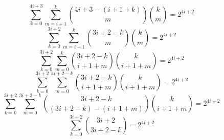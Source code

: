 \begin{equation*}
    \sum_{k=0}^{4i+3} \sum_{m=i+1}^{k} \binom{4i+3-(i+1+k)}{m} \binom{k}{m} = 2^{4i+2}
\end{equation*}
\begin{equation*}
    \sum_{k=0}^{3i+2} \sum_{m=i+1}^{k} \binom{3i+2-k}{m} \binom{k}{m} = 2^{4i+2}
\end{equation*}
\begin{equation*}
    \sum_{k=0}^{3i+2} \sum_{m=0}^{k} \binom{3i+2-k}{i+1+m} \binom{k}{i+1+m} = 2^{4i+2}
\end{equation*}
\begin{equation*}
    \sum_{k=0}^{3i+2} \sum_{m=0}^{3i+2-k} \binom{3i+2-k}{i+1+m} \binom{k}{i+1+m} = 2^{4i+2}
\end{equation*}
\begin{equation*}
    \sum_{k=0}^{3i+2} \sum_{m=0}^{3i+2-k} \binom{3i+2-k}{(3i+2-k)-(i+1+m)} \binom{k}{i+1+m} = 2^{4i+2}
\end{equation*}
\begin{equation*}
    \sum_{k=0}^{3i+2}  \binom{3i+2}{3i+2-k} = 2^{4i+2}
\end{equation*}
